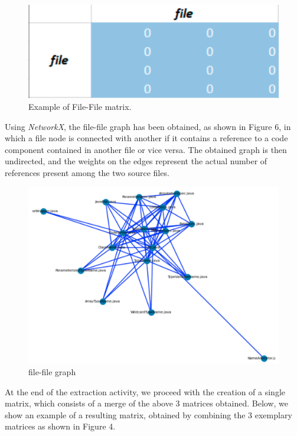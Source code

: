 \documentclass[sigconf]{acmart}
\begin{document}
\begin{figure}[h]
  \centering
  \includegraphics[width=\linewidth]{img_2}
  \caption{Example of File-File  matrix.}
  \Description{}
\end{figure}

Using {\itshape NetworkX}, the file-file graph has been obtained, as shown in Figure 6, in which a file node is connected with another if it contains a reference to a code component contained in another file or vice versa. The obtained graph is then undirected, and the weights on the edges represent the actual number of references present among the two source files.

\begin{figure}[h]
  \centering
  \includegraphics[width=\linewidth]{img_10}
  \caption{file-file graph}
  \Description{}
\end{figure}

At the end of the extraction activity, we proceed with the creation of a single matrix, which consists of a merge of the above 3 matrices obtained.
Below, we show an example of a resulting matrix, obtained by combining the 3 exemplary matrices as shown in Figure 4.
\end{document}
